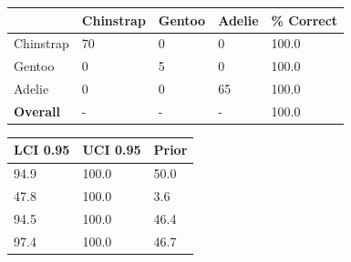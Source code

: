 \documentclass[
  authoryear,
  preprint,
  3p]{elsarticle}
\begin{document}
\begin{figure}

\begin{minipage}[b]{0.50\linewidth}

{\centering 

\begin{longtable}[]{@{}lllll@{}}
\toprule()
& Chinstrap & Gentoo & Adelie & \textbf{\% Correct} \\
\midrule()
\endhead
Chinstrap & 70 & 0 & 0 & 100.0 \\
Gentoo & 0 & 5 & 0 & 100.0 \\
Adelie & 0 & 0 & 65 & 100.0 \\
\textbf{Overall} & - & - & - & 100.0 \\
\bottomrule()
\end{longtable}

}

\end{minipage}%
%
\begin{minipage}[b]{0.50\linewidth}

{\centering 

\begin{longtable}[]{@{}lll@{}}
\toprule()
LCI 0.95 & UCI 0.95 & Prior \\
\midrule()
\endhead
94.9 & 100.0 & 50.0 \\
47.8 & 100.0 & 3.6 \\
94.5 & 100.0 & 46.4 \\
97.4 & 100.0 & 46.7 \\
\bottomrule()
\end{longtable}

}

\end{minipage}%
\newline
\begin{minipage}[b]{0.33\linewidth}

{\centering 

}
\end{minipage}
\end{figure}
\end{document}
